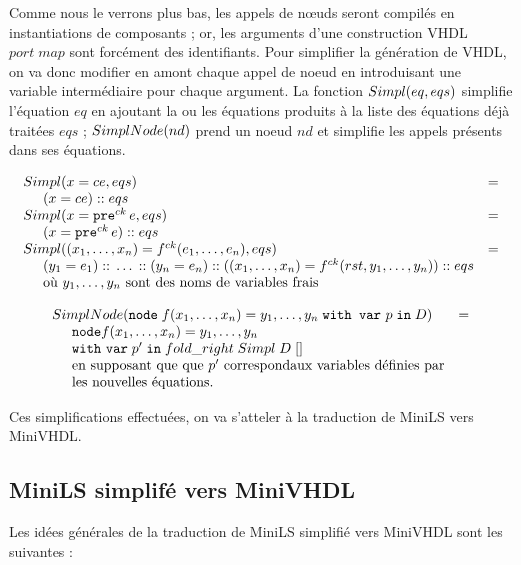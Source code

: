 \documentclass[a4paper]{article}
\newcommand{\mybox}[1]{\mbox{\tt{#1}}}
\newcommand{\ind}[0]{\hspace{0.5cm}}
\newcommand{\Cons}[0]{\; \mathbf{::} \;}
\newcommand{\Node}[4]{\mybox{node} \; f(#1) = #2 \; \mybox{with var} \
  #3 \; \mybox{in} \; #4}
\newcommand{\Pre}[1]{\mybox{pre}^{ck} \, #1}
\newcommand{\App}[2]{#1^{ck}(#2)}
\begin{document}
Comme nous le verrons plus bas, les appels de nœuds seront compil\'es en
instantiations de composants ; or, les arguments d'une construction VHDL $port
\; map$ sont forc\'ement des identifiants. Pour simplifier la génération de
VHDL, on va donc modifier en amont chaque appel de noeud en introduisant une
variable interm\'ediaire pour chaque argument. La fonction $Simpl(eq,eqs)$
simplifie l'équation $eq$ en ajoutant la ou les équations produits à la liste
des équations déjà traitées $eqs$ ; $SimplNode(nd)$ prend un noeud $nd$ et
simplifie les appels présents dans ses équations.

\[
\begin{array}{ll}
  \simpl{x = ce}{eqs} & = \\
  \ind (x = ce) \Cons eqs \\
  \simpl{x = \Pre{e}}{eqs} & = \\
  \ind (x = \Pre{e}) \Cons eqs \\

  \simpl{(x_1,\dots,x_n) = \App{f}{e_1,\dots,e_n}}{eqs} & = \\
  \ind (y_1 = e_1) \Cons \dots \Cons (y_n = e_n)
  \Cons ((x_1,\dots,x_n) = \App{f}{rst,y_1,\dots,y_n}) \Cons eqs \\
  \ind \mbox{o\`u } y_1,\dots,y_n \mbox{ sont des noms de variables frais}
\end{array}
\]

\[
\begin{array}{ll}
  \simplnd{\Node{x_1,\dots,x_n}{y_1,\dots,y_n}{p}{D}} & = \\
  \ind \mathtt{node} f(x_1,\dots,x_n) = y_1, \dots, y_n \; \\
  \ind \mathtt{with} \  \mathtt{var} \; p' \; \mathtt{in} \; fold\_right \;Simpl
  \; D \; [] \\
  \ind \mbox{en supposant que que } p' \mbox{ correspond}
  \mbox{aux variables d\'efinies par} \\ \ind \mbox{les nouvelles \'equations.}
\end{array}
\]

Ces simplifications effectu\'ees, on va s'atteler \`a la traduction de MiniLS vers
MiniVHDL.

\subsection{MiniLS simplif\'e vers MiniVHDL}

Les id\'ees g\'en\'erales de la traduction de MiniLS simplifi\'e vers MiniVHDL sont les
suivantes :
\end{document}
